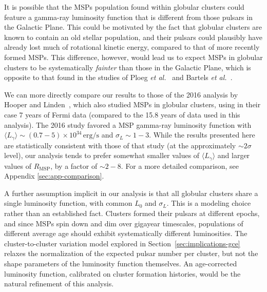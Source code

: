 It is possible that the MSPs population found within globular clusters could feature a gamma-ray luminosity function that is different from those pulsars in the Galactic Plane. This could be motivated by the fact that globular clusters are known to contain an old stellar population, and their pulsars could plausibly have already lost much of rotational kinetic energy, compared to that of more recently formed MSPs. This difference, however, would lead us to expect MSPs in globular clusters to be systematically \textit{fainter} than those in the Galactic Plane, which is opposite to that found in the studies of Ploeg \textit{et al.}~\cite{Ploeg:2017vai} and Bartels \textit{et al.}~\cite{Bartels:2018xom}.   

We can more directly compare our results to those of the 2016 analysis by Hooper and Linden~\cite{Hooper:2016rap}, which also studied MSPs in globular clusters, using in their case 7 years of Fermi data (compared to the 15.8 years of data used in this analysis). The 2016 study favored a MSP gamma-ray luminosity function with $\langle L_{\gamma} \rangle \sim (0.7-5) \times 10^{34} \, \textrm{erg/s}$ and $\sigma_L \sim 1-3$. While the results presented here are statistically consistent with those of that study (at the approximately $\sim 2\sigma$ level), our analysis tends to prefer somewhat smaller values of $\langle L_{\gamma} \rangle$ and larger values of $R_\textrm{MSP}$, by a factor of $\sim 2-8$. For a more detailed comparison, see Appendix \ref{sec:app-comparison}.

A further assumption implicit in our analysis is that all globular clusters share a single luminosity function, with common $L_0$ and $\sigma_L$. This is a modeling choice rather than an established fact. Clusters formed their pulsars at different epochs, and since MSPs spin down and dim over gigayear timescales, populations of different average age should exhibit systematically different luminosities. The cluster-to-cluster variation model explored in Section~\ref{sec:implications-gce} relaxes the normalization of the expected pulsar number per cluster, but not the shape parameters of the luminosity function themselves. An age-corrected luminosity function, calibrated on cluster formation histories, would be the natural refinement of this analysis.

